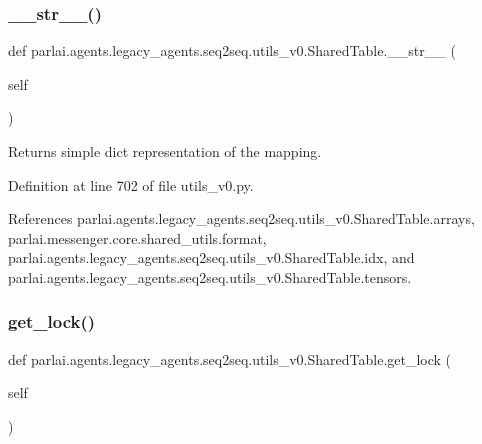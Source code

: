 \subsubsection{\texorpdfstring{\+\_\+\+\_\+str\+\_\+\+\_\+()}{\_\_str\_\_()}}
{\footnotesize\ttfamily def parlai.\+agents.\+legacy\+\_\+agents.\+seq2seq.\+utils\+\_\+v0.\+Shared\+Table.\+\_\+\+\_\+str\+\_\+\+\_\+ (\begin{DoxyParamCaption}\item[{}]{self }\end{DoxyParamCaption})}

\begin{DoxyVerb}Returns simple dict representation of the mapping.\end{DoxyVerb}
 

Definition at line 702 of file utils\+\_\+v0.\+py.



References parlai.\+agents.\+legacy\+\_\+agents.\+seq2seq.\+utils\+\_\+v0.\+Shared\+Table.\+arrays, parlai.\+messenger.\+core.\+shared\+\_\+utils.\+format, parlai.\+agents.\+legacy\+\_\+agents.\+seq2seq.\+utils\+\_\+v0.\+Shared\+Table.\+idx, and parlai.\+agents.\+legacy\+\_\+agents.\+seq2seq.\+utils\+\_\+v0.\+Shared\+Table.\+tensors.

\mbox{\label{classparlai_1_1agents_1_1legacy__agents_1_1seq2seq_1_1utils__v0_1_1SharedTable_ad5d29371323182d5d5431300ee6aaba1}} 
\subsubsection{\texorpdfstring{get\+\_\+lock()}{get\_lock()}}
{\footnotesize\ttfamily def parlai.\+agents.\+legacy\+\_\+agents.\+seq2seq.\+utils\+\_\+v0.\+Shared\+Table.\+get\+\_\+lock (\begin{DoxyParamCaption}\item[{}]{self }\end{DoxyParamCaption})}



